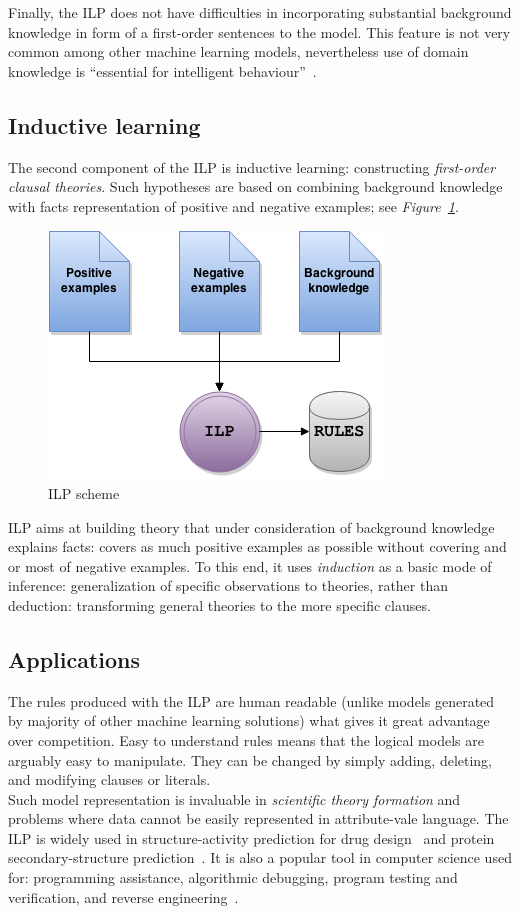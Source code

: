 \documentclass[10pt, a4paper, pdflatex, leqno, twoside, openright]{report}
\begin{document}
Finally, the ILP does not have difficulties in incorporating substantial background knowledge in form of a first-order sentences to the model. This feature is not very common among other machine learning models, nevertheless use of domain knowledge is ``essential for intelligent behaviour''~\citep{muggleton1994inductive}.

    \subsection{Inductive learning}
The second component of the ILP is inductive learning: constructing \emph{first-order clausal theories}. Such hypotheses are based on combining background knowledge with facts representation of positive and negative examples; see \emph{Figure~\ref{fig:ilp}}.\\
\begin{figure}[htb]
  \centering
  \includegraphics[scale=.5]{./gfx/ilp}
  \caption{ILP scheme\label{fig:ilp}}
\end{figure}
ILP aims at building theory that under consideration of background knowledge explains facts: covers as much positive examples as possible without covering and or most of negative examples. To this end, it uses \emph{induction} as a basic mode of inference: generalization of specific observations to theories, rather than deduction: transforming general theories to the more specific clauses.

    \subsection{Applications}
The rules produced with the ILP are human readable (unlike models generated by majority of other machine learning solutions) what gives it great advantage over competition. Easy to understand rules means that the logical models are arguably easy to manipulate. They can be changed by simply adding, deleting, and modifying clauses or literals.\\
Such model representation is invaluable in \emph{scientific theory formation} and problems where data cannot be easily represented in attribute-vale language. The ILP is widely used in structure-activity prediction for drug design~\citep{king1992drug,michael1992modelling} and protein secondary-structure prediction~\citep{muggleton1992protein}. It is also a popular tool in computer science used for: programming assistance, algorithmic debugging, program testing and verification, and reverse engineering~\citep{shapiro1983algorithmic,bergadno1993inductive,bratko1993inductive}.\\
\end{document}
